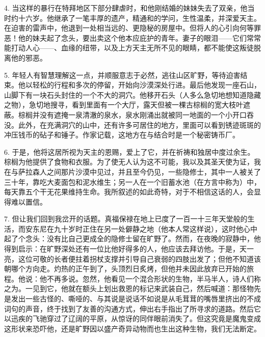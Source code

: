 4. 当这样的暴行在特拜地区下部分肆虐时，和他刚结婚的妹妹失去了双亲，他当时约十六岁。他继承了一笔丰厚的遗产，精通和的学问，生性温柔，并深爱天主。在迫害的雷声中，他退到一处相当远的、更隐秘的房屋中。但将人的心引向何等罪恶！他的妹夫起了念头，要出卖这个他本应庇护的青年。妻子的眼泪——它们常常能打动人心——、血缘的纽带，以及上方天主无所不见的眼睛，都不能使这叛徒脱离他的邪恶。\par

5. 年轻人有智慧理解这一点，并顺服意志于必然，逃往山区旷野，等待迫害结束。他以轻松的行程和多次的停留，开始向沙漠深处行进。最后他发现一座石山，山脚下有一块石头封住的一个不大的洞穴。他移开石头（人多么急切地想知道隐藏之物），急切地搜寻，看到里面有一个大厅，露天但被一棵古棕榈的宽大枝叶遮蔽。棕榈并没有遮掩一泉清澈的泉水，泉水刚涌出就被同一地面的一个小开口吞没。此外，在充满洞穴的山中，还有许多可居住的地方，里面可以看到锈迹斑斑的冲压钱币的砧子和锤子。作家记载，这地方在与结合时是一个秘密铸币厂。\par

6. 于是，他将这居所视为天主的恩赐，爱上了它，并在祈祷和独居中度过余生。棕榈为他提供了食物和衣服。为了使无人认为这不可能，我以及其圣天使为证，我在与萨拉森人之间那片沙漠中见过，并且至今仍见，一些隐修士，其中一人被关了三十年，靠吃大麦面包和泥水维生；另一人在一个旧蓄水池（在方言中称为）中，每天靠五个干无花果维持生命。我所叙述的如此奇特，对于不相信这话的人，会显得难以置信。\par

7. 但让我们回到我岔开的话题。真福保禄在地上已度了一百一十三年天堂般的生活，而安东尼在九十岁时正住在另一处僻静之地（他本人常这样说），这时他心中起了个念头：没有比自己更成全的隐修士留在旷野了。然而，在夜晚的寂静中，他得到启示：在旷野深处还有一位比他好得多的人，他应该去拜访他。于是，天一亮，这位可敬的长者便拄着拐杖支撑并引导自己衰弱的四肢出发了；但他不知道该朝哪个方向走。灼热的正午到了，头顶烈日炙烤，但他并未因此放弃已开始的旅程。他说：他不再多说。忽然，他看见一个混合形状的生物，半马半人，诗人们称之为。一见到它，他就在额头上划出救恩的标记来武装自己，然后喊道：那怪物先是发出一些古怪的、嘶哑的、与其说是说话不如说是从毛茸茸的嘴唇里挤出的不成词句的声音，终于找到了友善的沟通方式，伸出右手指出了所寻求的道路。然后它以迅疾的飞驰穿过了辽阔的平原，从惊讶的同伴眼前消失了。但这究竟是魔鬼变成这形状来恐吓他，还是旷野因以盛产奇异动物而也生出这种生物，我们无法断定。\par

